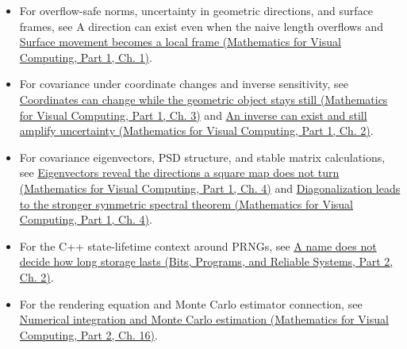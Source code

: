 \begin{itemize}
\tightlist
\item
  For overflow-safe norms, uncertainty in geometric directions, and surface frames, see {A direction can exist even when the naive length overflows} and \href{../02-Mathematics-for-Visual-Computing-P01/main.pdf\#nameddest=01-foundations-i-ch017-surface-movement-becomes-a-local-frame}{Surface movement becomes a local frame (Mathematics for Visual Computing, Part 1, Ch. 1)}.
\item
  For covariance under coordinate changes and inverse sensitivity, see \href{../02-Mathematics-for-Visual-Computing-P01/main.pdf\#nameddest=01-foundations-i-ch019-coordinates-can-change-while-the-geometric-object-stays-still}{Coordinates can change while the geometric object stays still (Mathematics for Visual Computing, Part 1, Ch. 3)} and \href{../02-Mathematics-for-Visual-Computing-P01/main.pdf\#nameddest=01-foundations-i-ch018-an-inverse-can-exist-and-still-amplify-uncertainty}{An inverse can exist and still amplify uncertainty (Mathematics for Visual Computing, Part 1, Ch. 2)}.
\item
  For covariance eigenvectors, PSD structure, and stable matrix calculations, see \href{../02-Mathematics-for-Visual-Computing-P01/main.pdf\#nameddest=01-foundations-i-ch020-eigenvectors-reveal-the-directions-a-square-map-does-not-turn}{Eigenvectors reveal the directions a square map does not turn (Mathematics for Visual Computing, Part 1, Ch. 4)} and \href{../02-Mathematics-for-Visual-Computing-P01/main.pdf\#nameddest=01-foundations-i-ch020-diagonalization-leads-to-the-stronger-symmetric-spectral-theorem}{Diagonalization leads to the stronger symmetric spectral theorem (Mathematics for Visual Computing, Part 1, Ch. 4)}.
\item
  For the C++ state-lifetime context around PRNGs, see \href{../01-Bits-Programs-and-Reliable-Systems-P02/main.pdf\#nameddest=01-foundations-i-ch002-a-name-does-not-decide-how-long-storage-lasts}{A name does not decide how long storage lasts (Bits, Programs, and Reliable Systems, Part 2, Ch. 2)}.
\item
  For the rendering equation and Monte Carlo estimator connection, see \href{../02-Mathematics-for-Visual-Computing-P02/main.pdf\#nameddest=03-visual-computing-i-ch012-numerical-integration-and-monte-carlo-estimation}{Numerical integration and Monte Carlo estimation (Mathematics for Visual Computing, Part 2, Ch. 16)}.
\end{itemize}

